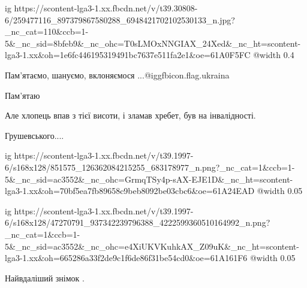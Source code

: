  
 
 
 
 

\ifcmt
  ig https://scontent-lga3-1.xx.fbcdn.net/v/t39.30808-6/259477116_897379867580288_6948421702102530133_n.jpg?_nc_cat=110&ccb=1-5&_nc_sid=8bfeb9&_nc_ohc=T0sLMOxNNGIAX_24Xed&_nc_ht=scontent-lga3-1.xx&oh=1e6fc446195319491bc7637e511fa2e1&oe=61A0F5FC
  @width 0.4
\fi

Пам'ятаємо, шануємо,
вклоняємося ...@igg{fbicon.flag.ukraina}

Пам'ятаю

Але хлопець впав з тієї висоти, і зламав хребет, був на інвалідності.

Грушевського....


\ifcmt
  ig https://scontent-lga3-1.xx.fbcdn.net/v/t39.1997-6/s168x128/851575_126362084215255_683178977_n.png?_nc_cat=1&ccb=1-5&_nc_sid=ac3552&_nc_ohc=GrmqTSy4p-sAX-EJE1D&_nc_ht=scontent-lga3-1.xx&oh=70bf5ea7fb89658c9beb8092be03cbc6&oe=61A24EAD
  @width 0.05
\fi


\ifcmt
  ig https://scontent-lga3-1.xx.fbcdn.net/v/t39.1997-6/s168x128/47270791_937342239796388_4222599360510164992_n.png?_nc_cat=1&ccb=1-5&_nc_sid=ac3552&_nc_ohc=e4XiUKVKuhkAX_Z09uK&_nc_ht=scontent-lga3-1.xx&oh=665286a33f2de9c1f6de86f31be54cd0&oe=61A161F6
  @width 0.05
\fi

Найвдаліший знімок .
